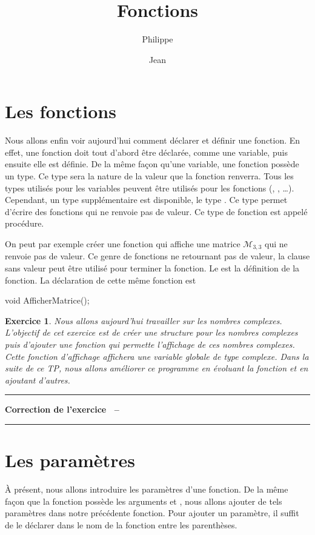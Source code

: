 \documentclass[a4paper]{article}
\title{Fonctions}
\author{Philippe \Nom{Rinaudo}\and{}Jean \Nom{Simard}}
\date{\Date[l]{20}{10}{2009}}
\newtheorem{Exo}{Exercice}
\newenvironment{Correction}{\par\tiny\blue\rule[1ex]{\textwidth}{1pt}\par\normalsize\textbf{Correction de l'exercice~\theExo{} -- }}{\par\tiny\blue\rule[1ex]{\textwidth}{1pt}\par}
\begin{document}
	\maketitle
	\section{Les fonctions}
		Nous allons enfin voir aujourd'hui comment déclarer et définir une fonction.
		En effet, une fonction doit tout d'abord être déclarée, comme une variable, puis ensuite elle est définie.
		De la même façon qu'une variable, une fonction possède un type.
		Ce type sera la nature de la valeur que la fonction renverra.
		Tous les types utilisés pour les variables peuvent être utilisés pour les fonctions (, , \dots{}).
		Cependant, un type supplémentaire est disponible, le type .
		Ce type permet d'écrire des fonctions qui ne renvoie pas de valeur.
		Ce type de fonction est appelé procédure.

		On peut par exemple créer une fonction qui affiche une matrice $\mathcal{M}_{3,3}$ qui ne renvoie pas de valeur.
		Ce genre de fonctions ne retournant pas de valeur, la clause  sans valeur peut être utilisé pour terminer la fonction.
		Le  est la définition de la fonction.
		La déclaration de cette même fonction est
		\begin{Code*}
void AfficherMatrice();
		\end{Code*}

		\begin{Exo}
			Nous allons aujourd'hui travailler sur les nombres complexes.
			L'objectif de cet exercice est de créer une structure pour les nombres complexes puis d'ajouter une fonction qui permette l'affichage de ces nombres complexes.
			Cette fonction d'affichage affichera une variable globale de type complexe.
			Dans la suite de ce TP, nous allons améliorer ce programme en évoluant la fonction et en ajoutant d'autres.
		\end{Exo}
		\begin{Correction}
		\end{Correction}
	\section{Les paramètres}
		À présent, nous allons introduire les paramètres d'une fonction.
		De la même façon que la fonction  possède les arguments  et , nous allons ajouter de tels paramètres dans notre précédente fonction.
		Pour ajouter un paramètre, il suffit de le déclarer dans le nom de la fonction entre les parenthèses.
		
\end{document}
